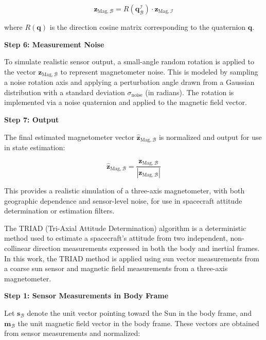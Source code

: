 \begin{equation}
    \mathbf{z}_{\text{Mag},\mathcal{B}} = R(\mathbf{q}_{\mathcal{B}}^{\mathcal{I}}) \cdot \mathbf{z}_{\text{Mag},\mathcal{I}}
\end{equation}

where $R(\mathbf{q})$ is the direction cosine matrix corresponding to the quaternion $\mathbf{q}$.

\textbf{Step 6: Measurement Noise}

To simulate realistic sensor output, a small-angle random rotation is applied to the vector $\mathbf{z}_{\text{Mag},\mathcal{B}}$ to represent magnetometer noise. This is modeled by sampling a noise rotation axis and applying a perturbation angle drawn from a Gaussian distribution with a standard deviation $\sigma_{\text{noise}}$ (in radians). The rotation is implemented via a noise quaternion and applied to the magnetic field vector.

\textbf{Step 7: Output}

The final estimated magnetometer vector $\hat{\mathbf{z}}_{\text{Mag},\mathcal{B}}$ is normalized and output for use in state estimation:

\begin{equation}
    \hat{\mathbf{z}}_{\text{Mag},\mathcal{B}} = \frac{\mathbf{z}_{\text{Mag},\mathcal{B}}}{|\mathbf{z}_{\text{Mag},\mathcal{B}}|}
\end{equation}

This provides a realistic simulation of a three-axis magnetometer, with both geographic dependence and sensor-level noise, for use in spacecraft attitude determination or estimation filters.



The TRIAD (Tri-Axial Attitude Determination) algorithm is a deterministic method used to estimate a spacecraft's attitude from two independent, non-collinear direction measurements expressed in both the body and inertial frames. In this work, the TRIAD method is applied using sun vector measurements from a coarse sun sensor and magnetic field measurements from a three-axis magnetometer.

\textbf{Step 1: Sensor Measurements in Body Frame}

Let $\mathbf{s}_{\mathcal{B}}$ denote the unit vector pointing toward the Sun in the body frame, and $\mathbf{m}_{\mathcal{B}}$ the unit magnetic field vector in the body frame. These vectors are obtained from sensor measurements and normalized:


